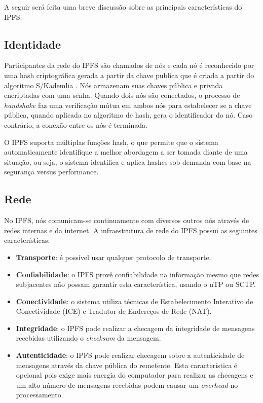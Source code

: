 \documentclass[tcc,capa]{texufpel}
\begin{document}
        A seguir será feita uma breve discussão sobre as principais características do IPFS.
    
    \subsection{Identidade}
    	
    	Participantes da rede do IPFS são chamados de nós e cada nó é reconhecido por uma hash criptográfica gerada a partir da chave publica que é criada a partir do algoritmo S/Kademlia \cite{benet2014ipfs}. Nós armazenam suas chaves pública e privada encriptadas com uma senha. Quando dois nós são conectados, o processo de \textit{handshake} faz uma verificação mútua em ambos nós para estabelecer se a chave pública, quando aplicada no algoritmo de hash, gera o identificador do nó. Caso contrário, a conexão entre os nós é terminada.
    	
    	O IPFS suporta múltiplas funções hash, o que permite que o sistema automaticamente identifique a melhor abordagem a ser tomada diante de uma situação, ou seja, o sistema identifica e aplica hashes sob demanda com base na segurança versus performance.
        
    \subsection{Rede}
        
        No IPFS, nós comunicam-se continuamente com diversos outros nós através de redes internas e da internet. A infraestrutura de rede do IPFS possui as seguintes características:
        
        \begin{itemize}
            \item \textbf{Transporte}: é possível usar qualquer protocolo de transporte.
            \item \textbf{Confiabilidade}: o IPFS provê confiabilidade na informação mesmo que redes subjacentes não possam garantir esta característica, usando o uTP ou SCTP.
            \item \textbf{Conectividade}: o sistema utiliza técnicas de Estabelecimento Interativo de Conectividade (ICE) e Tradutor de Endereços de Rede (NAT).
            \item \textbf{Integridade}: o IPFS pode realizar a checagem da integridade de mensagens recebidas utilizando o \textit{checksum} da mensagem.
            \item \textbf{Autenticidade}: o IPFS pode realizar checagem sobre a autenticidade de mensagens através da chave pública do remetente. Esta característica é opcional pois exige mais energia do computador para realizar as checagens e um alto número de mensagens recebidas podem causar um \textit{overhead} no processamento.
        \end{itemize}
        
\end{document}
